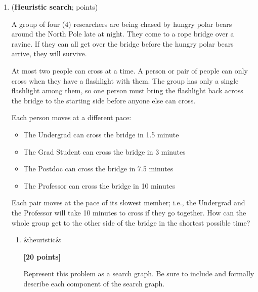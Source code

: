 \documentclass{article}
\newcounter{totalpoints}
\newcommand{\question}[2][]{(\textbf{#2}; \subtotal{#1})}
\newcommand{\subtotal}[1]{\newcounter{#1}\setcounter{#1}{0}\regtotcounter{#1}\total{#1} points}
\newcommand{\points}[2][]{{\addtocounter{totalpoints}{#2}\ifx&#1&\else\addtocounter{#1}{#2}\fi\textbf{[#2 points]}}}
\begin{document}
\begin{enumerate}
\begin{enumerate}
\item \points[uninformed]{6}
List the paths that are removed from the frontier by iterative deepening search (IDS) applied to the problem you specified in part~(\ref{q:uninformed-graph}), \textbf{in the order in which they are removed} at each depth limit. The algorithm should stop as soon as it returns a solution. Then, compare the total number of nodes expanded by IDS to those expanded by depth-first search.
\begin{answer}{2.5in}
\end{answer}


\end{enumerate}





\clearpage
\item \question[heuristic]{Heuristic search}

A group of four (4) researchers are being chased by hungry polar bears around the North Pole late at night.
They come to a rope bridge over a ravine.  If they can all get over the bridge before the hungry polar bears arrive, they will survive.

At most two people can cross at a time.  A person or pair of people can only cross when they have a flashlight with them.  The group has only a single flashlight among them, so one person must bring the flashlight back across the bridge to the starting side before anyone else can cross.

Each person moves at a different pace:
\begin{itemize}
\item The Undergrad can cross the bridge in 1.5 minute
\item The Grad Student can cross the bridge in 3 minutes
\item The Postdoc can cross the bridge in 7.5 minutes
\item The Professor can cross the bridge in 10 minutes
\end{itemize}

Each pair moves at the pace of its slowest member; i.e., the Undergrad and the Professor will take 10 minutes to cross if they go together.
How can the whole group get to the other side of the bridge in the shortest possible time?

\begin{enumerate}
\item \points[heuristic]{20} \label{q:construct-rep}
Represent this problem as a search graph.
Be sure to include and formally describe each component of the search graph.
\begin{answer}{2.5in}
\end{answer}


\end{enumerate}
\end{enumerate}
\end{document}
